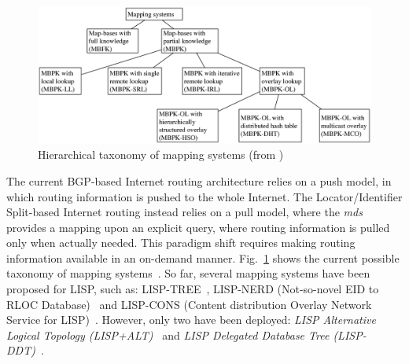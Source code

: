 \begin{figure}[!t]
	\centering
	\includegraphics[width=\textwidth]{Pics/Hierarchical_taxonomy_of_mapping_systems.eps}
	\caption{Hierarchical taxonomy of mapping systems (from \cite{info3-articles-2013-06})}
	\label{Hierarchical_taxonomy_of_mapping_systems}
\end{figure}
The current BGP-based Internet routing architecture relies on a push model, in which routing information is pushed to the whole Internet. The Locator/Identifier Split-based Internet routing instead relies on a pull model, where the \emph{\acrshort{mds}} provides a mapping upon an explicit query, where routing information is pulled only when actually needed. This paradigm shift requires making routing information available in an on-demand manner. %
Fig.~\ref{Hierarchical_taxonomy_of_mapping_systems} shows the current possible taxonomy of mapping systems~\cite{info3-articles-2013-06}. So far, several mapping systems have been proposed for LISP, such as: LISP-TREE~\cite{lispTree}, LISP-NERD (Not-so-novel EID to RLOC Database)~\cite{lear2013nerd} and LISP-CONS (Content distribution Overlay Network Service for LISP)~\cite{brim2008lisp}. However, only two have been deployed: \emph{LISP Alternative Logical Topology (LISP+ALT)}~\cite{rfc6836} and \emph{LISP Delegated Database Tree (LISP-DDT)}~\cite{lispDDT}.


